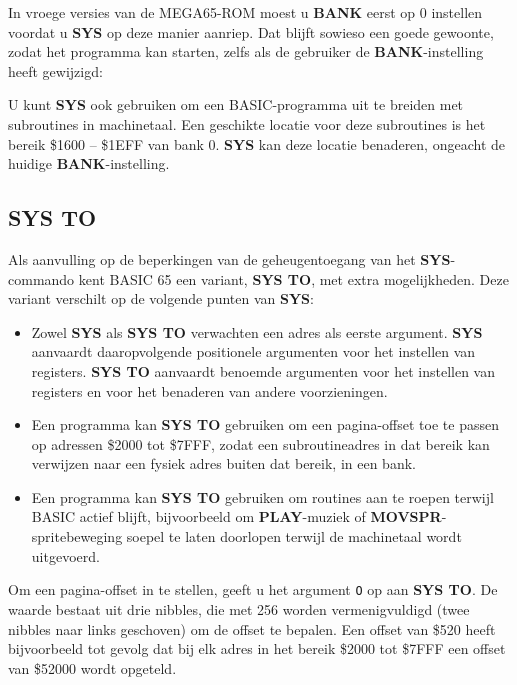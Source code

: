 In vroege versies van de MEGA65-ROM moest u {\bf BANK} eerst op 0 instellen voordat u {\bf SYS} op deze manier aanriep. Dat blijft sowieso een goede gewoonte, zodat het programma kan starten, zelfs als de gebruiker de {\bf BANK}-instelling heeft gewijzigd:


U kunt {\bf SYS} ook gebruiken om een BASIC-programma uit te breiden met subroutines in machinetaal. Een geschikte locatie voor deze subroutines is het bereik \$1600 -- \$1EFF van bank 0. {\bf SYS} kan deze locatie benaderen, ongeacht de huidige {\bf BANK}-instelling.

\subsection{SYS TO}

Als aanvulling op de beperkingen van de geheugentoegang van het {\bf SYS}-commando kent BASIC 65 een variant, {\bf SYS TO}, met extra mogelijkheden. Deze variant verschilt op de volgende punten van {\bf SYS}:

\begin{itemize}
    \item Zowel {\bf SYS} als {\bf SYS TO} verwachten een adres als eerste argument. {\bf SYS} aanvaardt daaropvolgende positionele argumenten voor het instellen van registers. {\bf SYS TO} aanvaardt benoemde argumenten voor het instellen van registers en voor het benaderen van andere voorzieningen.    \item Een programma kan {\bf SYS TO} gebruiken om een pagina-offset toe te passen op adressen \$2000 tot \$7FFF, zodat een subroutineadres in dat bereik kan verwijzen naar een fysiek adres buiten dat bereik, in een bank.    \item Een programma kan {\bf SYS TO} gebruiken om routines aan te roepen terwijl BASIC actief blijft, bijvoorbeeld om {\bf PLAY}-muziek of {\bf MOVSPR}-spritebeweging soepel te laten doorlopen terwijl de machinetaal wordt uitgevoerd.
\end{itemize}

Om een pagina-offset in te stellen, geeft u het argument \texttt{O} op aan {\bf SYS TO}. De waarde bestaat uit drie nibbles, die met 256 worden vermenigvuldigd (twee nibbles naar links geschoven) om de offset te bepalen. Een offset van \$520 heeft bijvoorbeeld tot gevolg dat bij elk adres in het bereik \$2000 tot \$7FFF een offset van \$52000 wordt opgeteld.

